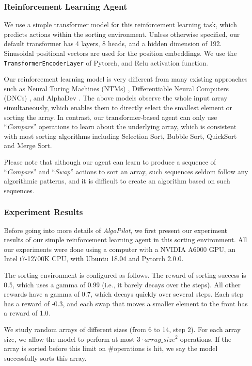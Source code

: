 \documentclass[pdflatex,sn-mathphys-num]{sn-jnl}%
\theoremstyle{thmstyleone}%
\theoremstyle{thmstyletwo}%
\theoremstyle{thmstylethree}%
\begin{document}
\subsubsection{Reinforcement Learning Agent} 

We use a simple transformer model for this reinforcement learning task, which predicts actions within the sorting environment. Unless otherwise specified, our default transformer has 4 layers, 8 heads, and a hidden dimension of 192. Sinusoidal positional vectors are used for the position embeddings. We use the \texttt{TransformerEncoderLayer} of Pytorch, and Relu activation function.

Our reinforcement learning model is very different from many existing approaches such as Neural Turing Machines (NTMs) \cite{graves2014neural}, Differentiable Neural Computers (DNCs) \cite{graves2016hybrid}, and AlphaDev \cite{alphadev2023}. The above models observe the whole input array simultaneously, which enables them to directly select the smallest element or sorting the array. In contrast, our transformer-based agent can only use ``\emph{Compare}'' operations to learn about the underlying array, which is consistent with most sorting algorithms including Selection Sort, Bubble Sort, QuickSort and Merge Sort.

Please note that although our agent can learn to produce a sequence of ``\emph{Compare}'' and ``\emph{Swap}'' actions to sort an array, such sequences seldom follow any algorithmic patterns, and it is difficult to create an algorithm based on such sequences.

\subsubsection{Experiment Results}

Before going into more details of \emph{AlgoPilot}, we first present our experiment results of our simple reinforcement learning agent in this sorting environment. All our experiments were done using a computer with a NVIDIA A6000 GPU, an Intel i7-12700K CPU, with Ubuntu 18.04 and Pytorch 2.0.0. 

The sorting environment is configured as follows. The reward of sorting success is 0.5, which uses a gamma of 0.99 (i.e., it barely decays over the steps). All other rewards have a gamma of 0.7, which decays quickly over several steps. Each step has a reward of -0.3, and each swap that moves a smaller element to the front has a reward of 1.0. 

We study random arrays of different sizes (from 6 to 14, step 2). For each array size, we allow the model to perform at most $3 \cdot array\_size^2 $ operations. If the array is sorted before this limit on \#operations is hit, we say the model successfully sorts this array. 
\end{document}
